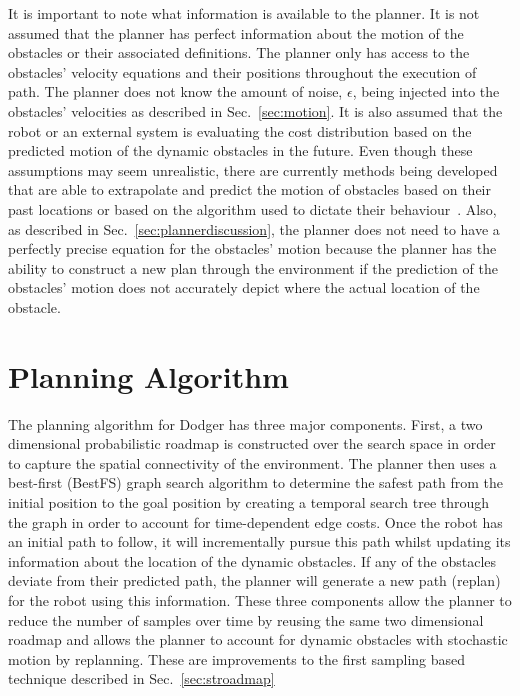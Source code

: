 It is important to note what information is available to the planner. It is not
assumed that the planner has perfect information about the motion of the
obstacles or their associated definitions. The planner only has access to the
obstacles' velocity equations and their positions throughout the execution of
path.  The planner does not know the amount of noise, $\epsilon$, being
injected into the obstacles' velocities as described in Sec.~\ref{sec:motion}.
It is also assumed that the robot or an external system is evaluating the cost
distribution based on the predicted motion of the dynamic obstacles in the
future. Even though these assumptions may seem unrealistic, there are currently
methods being developed that are able to extrapolate and predict the motion of
obstacles based on their past locations or based on the algorithm used to
dictate their behaviour~\cite{rus, cmu, boulder, edi1, edi2, keeper}. Also, as
described in Sec.~\ref{sec:plannerdiscussion}, the planner does not need to
have a perfectly precise equation for the obstacles' motion because the planner
has the ability to construct a new plan through the environment if the
prediction of the obstacles' motion does not accurately depict where the actual
location of the obstacle.

\section{Planning Algorithm}

\label{sec:design_planner}

The planning algorithm for Dodger has three major components. First, a two
dimensional probabilistic roadmap is constructed over the search space in order
to capture the spatial connectivity of the environment. The planner then uses a
best-first (BestFS) graph search algorithm to determine the safest path from
the initial position to the goal position by creating a temporal search tree
through the graph in order to account for time-dependent edge costs. Once the
robot has an initial path to follow, it will incrementally pursue this path
whilst updating its information about the location of the dynamic obstacles. If
any of the obstacles deviate from their predicted path, the planner will
generate a new path (replan) for the robot using this information. These three
components allow the planner to reduce the number of samples over time by
reusing the same two dimensional roadmap and allows the planner to account for
dynamic obstacles with stochastic motion by replanning. These are improvements
to the first sampling based technique described in Sec.~\ref{sec:stroadmap}


